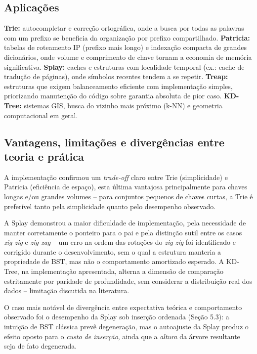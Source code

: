 \documentclass[11pt]{article}
\begin{document}
\subsection{Aplicações}

\textbf{Trie:} autocompletar e correção ortográfica, onde a busca por todas as
palavras com um prefixo se beneficia da organização por prefixo compartilhado.
\textbf{Patricia:} tabelas de roteamento IP (prefixo mais longo) e indexação
compacta de grandes dicionários, onde volume e comprimento de chave tornam a
economia de memória significativa.
\textbf{Splay:} caches e estruturas com localidade temporal (ex.: cache de
tradução de páginas), onde símbolos recentes tendem a se repetir.
\textbf{Treap:} estruturas que exigem balanceamento eficiente com
implementação simples, priorizando manutenção do código sobre garantia
absoluta de pior caso.
\textbf{KD-Tree:} sistemas GIS, busca do vizinho mais próximo (k-NN) e
geometria computacional em geral.

\subsection{Vantagens, limitações e divergências entre teoria e prática}

A implementação confirmou um \emph{trade-off} claro entre Trie (simplicidade)
e Patricia (eficiência de espaço), esta última vantajosa principalmente para
chaves longas e/ou grandes volumes -- para conjuntos pequenos de chaves
curtas, a Trie é preferível tanto pela simplicidade quanto pelo desempenho
observado.

A Splay demonstrou a maior dificuldade de implementação, pela necessidade de
manter corretamente o ponteiro para o pai e pela distinção sutil entre os
casos \textit{zig-zig} e \textit{zig-zag} -- um erro na ordem das rotações do
\textit{zig-zig} foi identificado e corrigido durante o desenvolvimento, sem o
qual a estrutura manteria a propriedade de BST, mas não o comportamento
amortizado esperado. A KD-Tree, na implementação apresentada, alterna a
dimensão de comparação estritamente por paridade de profundidade, sem
considerar a distribuição real dos dados -- limitação discutida na literatura.

O caso mais notável de divergência entre expectativa teórica e comportamento
observado foi o desempenho da Splay sob inserção ordenada (Seção 5.3): a
intuição de BST clássica prevê degeneração, mas o autoajuste da Splay produz o
efeito oposto para o \emph{custo de inserção}, ainda que a \emph{altura} da
árvore resultante seja de fato degenerada.
\end{document}
